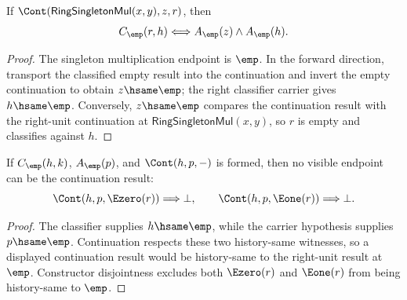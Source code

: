 \begin{theorem}
\label{thm:ring-singleton-classifier-mul-continuation-classifier}
If $\Cont(\mathsf{RingSingletonMul}(x,y),z,r)$, then
$$
C_{\emp}(r,h)\Longleftrightarrow A_{\emp}(z)\wedge A_{\emp}(h).
$$
\end{theorem}
\begin{proof}
The singleton multiplication endpoint is $\emp$. In the forward direction,
transport the classified empty result into the continuation and invert the
empty continuation to obtain $z\hsame\emp$; the right classifier carrier gives
$h\hsame\emp$. Conversely, $z\hsame\emp$ compares the continuation result with
the right-unit continuation at $\mathsf{RingSingletonMul}(x,y)$, so $r$ is
empty and classifies against $h$.
\end{proof}

\begin{theorem}\label{thm:ring-singleton-classifier-continuation-visible-result-absurd}
If $C_{\emp}(h,k)$, $A_{\emp}(p)$, and $\Cont(h,p,-)$ is formed, then no
visible endpoint can be the continuation result:
$$
\Cont(h,p,\Ezero(r))\Longrightarrow\bot,
\qquad
\Cont(h,p,\Eone(r))\Longrightarrow\bot.
$$
\end{theorem}
\begin{proof}
The classifier supplies $h\hsame\emp$, while the carrier hypothesis supplies
$p\hsame\emp$. Continuation respects these two history-same witnesses, so a
displayed continuation result would be history-same to the right-unit result
at $\emp$. Constructor disjointness excludes both $\Ezero(r)$ and $\Eone(r)$
from being history-same to $\emp$.
\end{proof}
